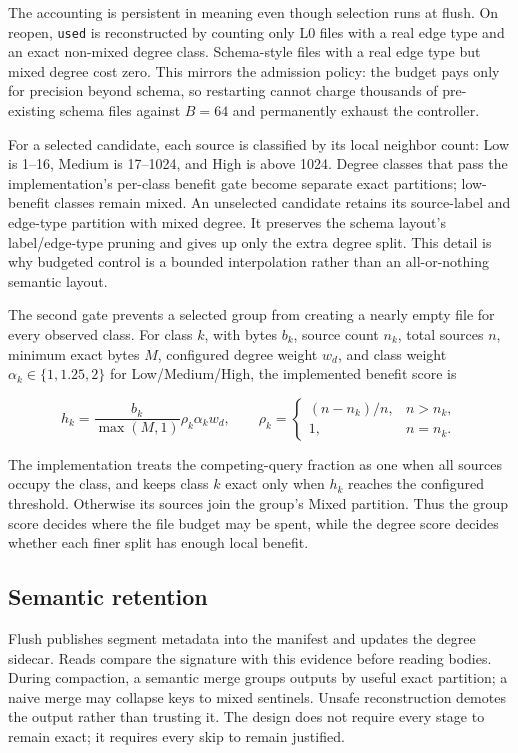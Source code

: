 \documentclass[sigconf,screen]{cidr-2027}
\begin{document}
The accounting is persistent in meaning even though selection runs at flush.
On reopen, \texttt{used} is reconstructed by counting only L0 files with a
real edge type and an exact non-mixed degree class. Schema-style files with a
real edge type but mixed degree cost zero. This mirrors the admission policy:
the budget pays only for precision beyond schema, so restarting cannot charge
thousands of pre-existing schema files against $B=64$ and permanently exhaust
the controller.

For a selected candidate, each source is classified by its local neighbor
count: Low is 1--16, Medium is 17--1024, and High is above 1024. Degree classes
that pass the implementation's per-class benefit gate become separate exact
partitions; low-benefit classes remain mixed. An unselected candidate retains
its source-label and edge-type partition with mixed degree. It preserves the
schema layout's label/edge-type pruning and gives up only the extra degree
split. This detail is why budgeted control is a bounded interpolation rather
than an all-or-nothing semantic layout.

The second gate prevents a selected group from creating a nearly empty file
for every observed class. For class $k$, with bytes $b_k$, source count $n_k$,
total sources $n$, minimum exact bytes $M$, configured degree weight $w_d$,
and class weight $\alpha_k\in\{1,1.25,2\}$ for Low/Medium/High, the implemented
benefit score is

\begin{equation}
h_k=\frac{b_k}{\max(M,1)}\rho_k\alpha_k w_d,\qquad
\rho_k=\begin{cases}(n-n_k)/n,&n>n_k,\\1,&n=n_k.\end{cases}
\label{eq:degree-gate}
\end{equation}

The implementation treats the competing-query fraction as one when all
sources occupy the class, and keeps class $k$ exact only when $h_k$ reaches the
configured threshold. Otherwise its sources join the group's Mixed partition.
Thus the group score decides where the file budget may be spent, while the
degree score decides whether each finer split has enough local benefit.

\subsection{Semantic retention}

Flush publishes segment metadata into the manifest and updates the degree
sidecar. Reads compare the signature with this evidence before reading bodies.
During compaction, a semantic merge groups outputs by useful exact partition;
a naive merge may collapse keys to mixed sentinels. Unsafe reconstruction
demotes the output rather than trusting it. The design does not require every
stage to remain exact; it requires every skip to remain justified.
\end{document}
